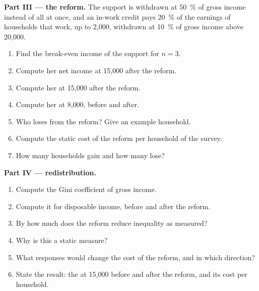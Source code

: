 \begin{problem}
\medskip\noindent\textbf{Part III --- the reform.} The support is withdrawn at 50~\% of
gross income instead of all at once, and an in-work credit pays 20~\% of the earnings of
households that work, up to 2{,}000, withdrawn at 10~\% of gross income above 20{,}000.
\begin{enumerate}[resume]
\item Find the break-even income of the support for $n = 3$.
\item Compute her net income at 15{,}000 after the reform.
\item Compute her  at 15{,}000 after the reform.
\item Compute her  at 8{,}000, before and after.
\item Who loses from the reform? Give an example household.
\item Compute the static cost of the reform per household of the survey.
\item How many households gain and how many lose?
\end{enumerate}

\medskip\noindent\textbf{Part IV --- redistribution.}
\begin{enumerate}[resume]
\item Compute the Gini coefficient of gross income.
\item Compute it for disposable income, before and after the reform.
\item By how much does the reform reduce inequality as measured?
\item Why is this a static measure?
\item What responses would change the cost of the reform, and in which direction?
\item State the result: the  at 15{,}000 before and after the
reform, and its cost per household.
\end{enumerate}
\end{problem}
